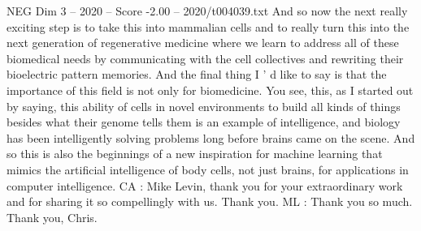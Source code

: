 \begin{textsample}{NEG Dim 3 – 2020 – Score -2.00 – 2020/t004039.txt}
And so now the next really exciting step is to take this into mammalian cells and to really turn this into the next generation of regenerative medicine where we learn to address all of these biomedical needs by communicating with the cell collectives and rewriting their bioelectric pattern memories.
And the final thing I ' d like to say is that the importance of this field is not only for biomedicine.
You see, this, as I started out by saying, this ability of cells in novel environments to build all kinds of things besides what their genome tells them is an example of intelligence, and biology has been intelligently solving problems long before brains came on the scene.
And so this is also the beginnings of a new inspiration for machine learning that mimics the artificial intelligence of body cells, not just brains, for applications in computer intelligence.
CA : Mike Levin, thank you for your extraordinary work and for sharing it so compellingly with us.
Thank you.
ML : Thank you so much.
Thank you, Chris.

\end{textsample}
